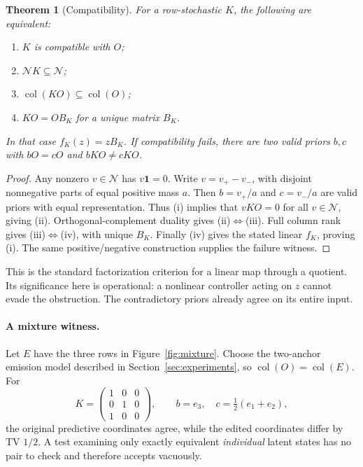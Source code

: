 \documentclass[11pt,letterpaper]{article}
\newtheorem{theorem}{Theorem}
\newcommand{\one}{\mathbf{1}}
\newcommand{\col}{\operatorname{col}}
\newcommand{\N}{\mathcal{N}}
\begin{document}
\begin{theorem}[Compatibility]\label{thm:compat}
For a row-stochastic $K$, the following are equivalent:
\begin{enumerate}[label=(\roman*)]
\item $K$ is compatible with $O$;
\item $\N K\subseteq\N$;
\item $\col(KO)\subseteq\col(O)$;
\item $KO=OB_K$ for a unique matrix $B_K$.
\end{enumerate}
In that case $f_K(z)=zB_K$. If compatibility fails, there are two valid priors $b,c$ with $bO=cO$ and $bKO\ne cKO$.
\end{theorem}
\begin{proof}
Any nonzero $v\in\N$ has $v\one=0$. Write $v=v_+-v_-$, with disjoint nonnegative parts of equal positive mass $a$. Then $b=v_+/a$ and $c=v_-/a$ are valid priors with equal representation. Thus (i) implies that $vKO=0$ for all $v\in\N$, giving (ii). Orthogonal-complement duality gives (ii)$\Leftrightarrow$(iii). Full column rank gives (iii)$\Leftrightarrow$(iv), with unique $B_K$. Finally (iv) gives the stated linear $f_K$, proving (i). The same positive/negative construction supplies the failure witness.
\end{proof}

This is the standard factorization criterion for a linear map through a quotient. Its significance here is operational: a nonlinear controller acting on $z$ cannot evade the obstruction. The contradictory priors already agree on its entire input.

\paragraph{A mixture witness.}
Let $E$ have the three rows in Figure~\ref{fig:mixture}. Choose the two-anchor emission model described in Section~\ref{sec:experiments}, so $\col(O)=\col(E)$. For
\begin{equation}
K=\begin{pmatrix}1&0&0\\0&1&0\\1&0&0\end{pmatrix},\qquad
b=e_3,\quad c=\tfrac12(e_1+e_2),
\end{equation}
the original predictive coordinates agree, while the edited coordinates differ by TV $1/2$. A test examining only exactly equivalent \emph{individual} latent states has no pair to check and therefore accepts vacuously.
\end{document}
